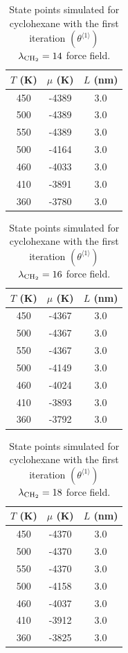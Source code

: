 \documentclass[journal=jctc,manuscript=article]{achemso}
\begin{document}
\begin{table}[htb!]
	\caption{State points simulated for cyclohexane with the first iteration $(\theta^{\langle1\rangle})$ $\lambda_{\rm CH_2} = 14$ force field.}
	\begin{center}
		\begin{tabular}{|c|c|c|}
			\hline
			$T$ (K) & $\mu$ (K) & $L$ (nm) \\ \hline
			450	&	-4389	&	3.0	\\
			500	&	-4389	&	3.0	\\
			550	&	-4389	&	3.0	\\
			500	&	-4164	&	3.0	\\
			460	&	-4033	&	3.0	\\
			410	&	-3891	&	3.0	\\
			360	&	-3780	&	3.0	\\
			\hline
		\end{tabular}
	\end{center}
\end{table}

\begin{table}[htb!]
	\caption{State points simulated for cyclohexane with the first iteration $(\theta^{\langle1\rangle})$ $\lambda_{\rm CH_2} = 16$ force field.}
	\begin{center}
		\begin{tabular}{|c|c|c|}
			\hline
			$T$ (K) & $\mu$ (K) & $L$ (nm) \\ \hline
			450	&	-4367	&	3.0	\\
			500	&	-4367	&	3.0	\\
			550	&	-4367	&	3.0	\\
			500	&	-4149	&	3.0	\\
			460	&	-4024	&	3.0	\\
			410	&	-3893	&	3.0	\\
			360	&	-3792	&	3.0	\\
			\hline
		\end{tabular}
	\end{center}
\end{table}

\begin{table}[htb!]
	\caption{State points simulated for cyclohexane with the first iteration $(\theta^{\langle1\rangle})$ $\lambda_{\rm CH_2} = 18$ force field.}
	\begin{center}
		\begin{tabular}{|c|c|c|}
			\hline
			$T$ (K) & $\mu$ (K) & $L$ (nm) \\ \hline
			450	&	-4370	&	3.0	\\
			500	&	-4370	&	3.0	\\
			550	&	-4370	&	3.0	\\
			500	&	-4158	&	3.0	\\
			460	&	-4037	&	3.0	\\
			410	&	-3912	&	3.0	\\
			360	&	-3825	&	3.0	\\
			\hline
		\end{tabular}
	\end{center}
\end{table}
\end{document}
